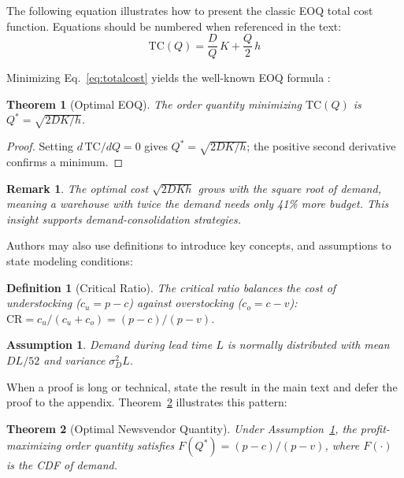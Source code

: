 \documentclass[preprint]{oscmjournal}
\newtheorem{theorem}{Theorem}
\newtheorem{definition}{Definition}
\newtheorem{assumption}{Assumption}
\newtheorem{remark}{Remark}
\begin{document}
The following equation illustrates how to present the classic EOQ total cost function.
Equations should be numbered when referenced in the text:
\begin{equation}
\text{TC}(Q) = \frac{D}{Q}\,K + \frac{Q}{2}\,h \label{eq:totalcost}
\end{equation}

Minimizing Eq.~\eqref{eq:totalcost} yields the well-known EOQ formula \parencite{harris1913how}:

\begin{theorem}[Optimal EOQ]\label{thm:eoq}
The order quantity minimizing $\mathrm{TC}(Q)$ is $Q^* = \sqrt{2DK/h}$.
\end{theorem}

\begin{proof}
Setting $d\,\text{TC}/dQ = 0$ gives $Q^* = \sqrt{2DK/h}$; the positive second derivative confirms a minimum.
\end{proof}

\begin{remark}\label{rem:sqrtcost}
The optimal cost $\sqrt{2DKh}$ grows with the square root of demand, meaning a warehouse with twice the demand needs only 41\% more budget. This insight supports demand-consolidation strategies.
\end{remark}

Authors may also use definitions to introduce key concepts, and assumptions to state modeling conditions:

\begin{definition}[Critical Ratio]\label{def:cr}
The critical ratio balances the cost of understocking ($c_u = p - c$) against overstocking ($c_o = c - v$):
$\text{CR} = {c_u}/({c_u + c_o}) = ({p - c})/({p - v})$.
\end{definition}

\begin{assumption}\label{asm:normal}
Demand during lead time $L$ is normally distributed with mean $DL/52$ and variance $\sigma_D^2 L$.
\end{assumption}

When a proof is long or technical, state the result in the main text and defer the proof to the appendix.
Theorem~\ref{thm:newsvendor} illustrates this pattern:

\begin{theorem}[Optimal Newsvendor Quantity]\label{thm:newsvendor}
Under Assumption~\ref{asm:normal}, the profit-maximizing order quantity satisfies $F(Q^*) = (p-c)/(p-v)$, where $F(\cdot)$ is the CDF of demand.
\end{theorem}
\end{document}
